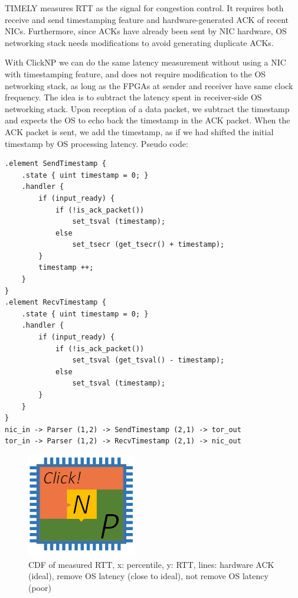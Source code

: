 {TIMELY \cite{mittal2015timely} measures RTT as the signal for congestion control. It requires both receive and send timestamping feature and hardware-generated ACK of recent NICs. Furthermore, since ACKs have already been sent by NIC hardware, OS networking stack needs modifications to avoid generating duplicate ACKs.

With ClickNP we can do the same latency measurement without using a NIC with timestamping feature, and does not require modification to the OS networking stack, as long as the FPGAs at sender and receiver have same clock frequency. The idea is to subtract the latency spent in receiver-side OS networking stack. Upon reception of a data packet, we subtract the timestamp and expects the OS to echo back the timestamp in the ACK packet. When the ACK packet is sent, we add the timestamp, as if we had shifted the initial timestamp by OS processing latency. Pseudo code:

\begin{lstlisting}
.element SendTimestamp {
    .state { uint timestamp = 0; }
    .handler {
        if (input_ready) {
            if (!is_ack_packet())
                set_tsval (timestamp);
            else
                set_tsecr (get_tsecr() + timestamp);
        }
        timestamp ++;
    }
}
.element RecvTimestamp {
    .state { uint timestamp = 0; }
    .handler {
        if (input_ready) {
            if (!is_ack_packet())
                set_tsval (get_tsval() - timestamp);
            else
                set_tsval (timestamp);
        }
    }
}
nic_in -> Parser (1,2) -> SendTimestamp (2,1) -> tor_out
tor_in -> Parser (1,2) -> RecvTimestamp (2,1) -> nic_out
\end{lstlisting}

\begin{figure}[h!]
	\centering
	\includegraphics[width=0.6\columnwidth]{image/logo}
	\vspace{-0.15in}
	\caption{CDF of measured RTT, x: percentile, y: RTT, lines: hardware ACK (ideal), remove OS latency (close to ideal), not remove OS latency (poor)}
	\vspace{-0.15in}
	\label{fig:TimestampAccuracy}
\end{figure}
}

